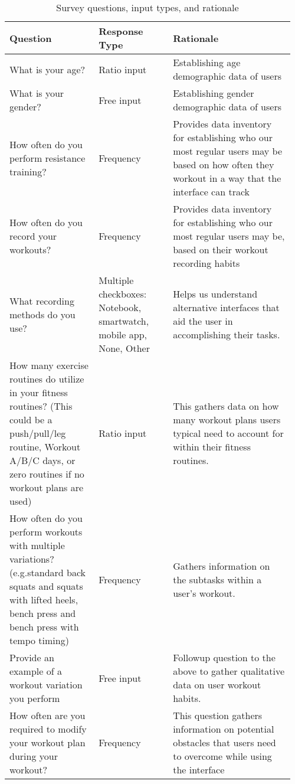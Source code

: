 \documentclass[
	letterpaper, %
]{jdf}
\begin{document}
\begin{table}[H] %
	\caption{Survey questions, input types, and rationale}
	\small %
	\centering %
	\begin{tabular}{L{0.30\linewidth} L{0.25\linewidth} L{0.41\linewidth}}
		\textbf{Question} & \textbf{Response Type} & \textbf{Rationale} \\
		\toprule[0.5pt]
            What is your age? & Ratio input & Establishing age demographic data of users \\
		\midrule
            What is your gender? & Free input & Establishing gender demographic data of users \\
            \midrule
            How often do you perform resistance training? & Frequency & Provides data inventory for establishing who our most regular users may be based on how often they workout in a way that the interface can track \\
            \midrule
            How often do you record your workouts? & Frequency & Provides data inventory for establishing who our most regular users may be, based on their workout recording habits  \\
            \midrule
            What recording methods do you use?  & Multiple checkboxes: Notebook, smartwatch, mobile app, None, Other & Helps us understand alternative interfaces that aid the user in accomplishing their tasks. \\
            \midrule
            How many exercise routines do utilize in your fitness routines? (This could be a push/pull/leg routine, Workout A/B/C days, or zero routines if no workout plans are used) & Ratio input & This gathers data on how many workout plans users typical need to account for within their fitness routines. \\
            \midrule
            How often do you perform workouts with multiple variations? (e.g.standard  back squats and squats with lifted heels, bench press and bench press with tempo timing) & Frequency & Gathers information on the subtasks within a user’s workout.  \\
            \midrule
            Provide an example of a workout variation you perform & Free input & Followup question to the above to gather qualitative data on user workout habits. \\
            \midrule
            How often are you required to modify your workout plan during your workout? & Frequency & This question gathers information on potential obstacles that users need to overcome while using the interface \\

\end{tabular}
\end{table}
\end{document}
